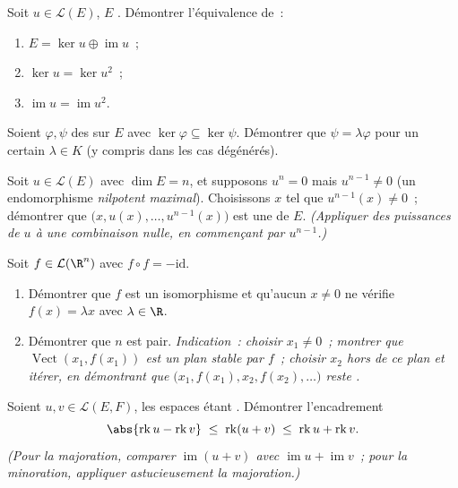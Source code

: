 \begin{exercise}[$\star\star$]\label{exo:b1:linmaps:7}
Soit $u \in \mathcal{L}(E)$, $E$ . Démontrer
l'équivalence de~:
\begin{enumerate}
  \item $E = \ker u \oplus \operatorname{im} u$~;
  \item $\ker u = \ker u^2$~;
  \item $\operatorname{im} u = \operatorname{im} u^2$.
\end{enumerate}
\end{exercise}

\begin{exercise}[$\star\star$]\label{exo:b1:linmaps:8}
Soient $\varphi, \psi$ des  sur $E$ avec $\ker\varphi
\subseteq \ker\psi$. Démontrer que $\psi = \lambda\varphi$ pour un certain
$\lambda \in K$ (y compris dans les cas dégénérés).
\end{exercise}

\begin{exercise}[$\star\star\star$]\label{exo:b1:linmaps:9}
Soit $u \in \mathcal{L}(E)$ avec $\dim E = n$, et supposons $u^n = 0$
mais $u^{n-1} \neq 0$ (un endomorphisme \emph{nilpotent maximal}).
Choisissons $x$ tel que $u^{n-1}(x) \neq 0$~; démontrer que $\bigl(x, u(x), \dots,
u^{n-1}(x)\bigr)$ est une  de $E$. \emph{(Appliquer des puissances de $u$ à une
combinaison nulle, en commençant par $u^{n-1}$.)}
\end{exercise}

\begin{exercise}[$\star\star\star$]\label{exo:b1:linmaps:10}
Soit $f \in \mathcal{L}(\R^n)$ avec $f \circ f = -\mathrm{id}$.
\begin{enumerate}
  \item Démontrer que $f$ est un isomorphisme et qu'aucun $x \neq 0$
        ne vérifie $f(x) = \lambda x$ avec $\lambda \in \R$.
  \item Démontrer que $n$ est pair. \emph{Indication~: choisir $x_1 \neq 0$~; montrer
        que $\operatorname{Vect}(x_1, f(x_1))$ est un plan stable par
        $f$~; choisir $x_2$ hors de ce plan et itérer, en démontrant que
        $\bigl(x_1, f(x_1), x_2, f(x_2), \dots\bigr)$ reste .}
\end{enumerate}
\end{exercise}

\begin{exercise}[$\star\star$]\label{exo:b1:linmaps:11}
Soient $u, v \in \mathcal{L}(E, F)$, les espaces étant .
Démontrer l'encadrement
\[
\abs{\operatorname{rk} u - \operatorname{rk} v}
\;\leq\; \operatorname{rk}(u + v)
\;\leq\; \operatorname{rk} u + \operatorname{rk} v .
\]
\emph{(Pour la majoration, comparer $\operatorname{im}(u+v)$ avec
$\operatorname{im} u + \operatorname{im} v$~; pour la minoration,
appliquer astucieusement la majoration.)}
\end{exercise}

